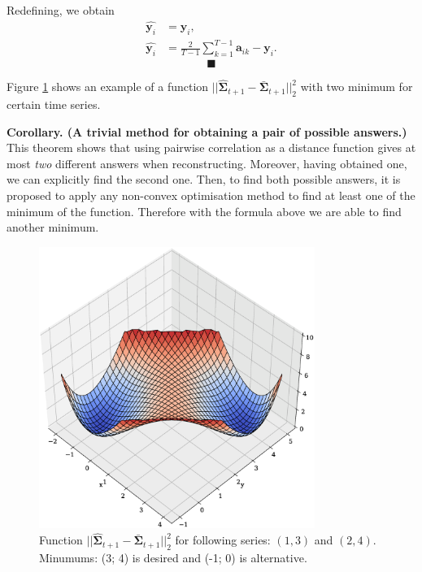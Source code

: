 \documentclass[12pt]{article}
\begin{document}
Redefining, we obtain
\begin{align*}
	\hat{\mathbf{y}_i} &= \mathbf{y}_i,\\
	\hat{\mathbf{y}_i} &= \frac{2}{T-1} \sum_{k=1}^{T-1} \mathbf{a}_{ik} - \mathbf{y}_i.
\end{align*}
$$ \blacksquare $$

Figure \ref{fig:fig2} shows an example of a function $||\hat{\mathbf{\Sigma}}_{t+1} - \bar{\mathbf{\Sigma}}_{t+1}||_2^2$ with two minimum for certain time series.

\textbf{Corollary. (A trivial method for obtaining a pair of possible answers.)} This theorem shows that using pairwise correlation as a distance function gives at most \emph{two} different answers when reconstructing. Moreover, having obtained one, we can explicitly find the second one. Then, to find both possible answers, it is proposed to apply any non-convex optimisation method to find at least one of the minimum of the function. Therefore with the formula above we are able to find another minimum.

\begin{figure}[!htbp]
	\centering
	\begin{center}
		\includegraphics[width=0.8\textwidth]{NonConvex.eps}
	\end{center}
	\caption{Function $||\hat{\mathbf{\Sigma}}_{t+1} - \bar{\mathbf{\Sigma}}_{t+1}||_2^2$ for following series: $(1, 3)$ and $(2, 4)$. Minumums: (3; 4) is desired and (-1; 0) is alternative.}
	\label{fig:fig2}
\end{figure}
\end{document}
